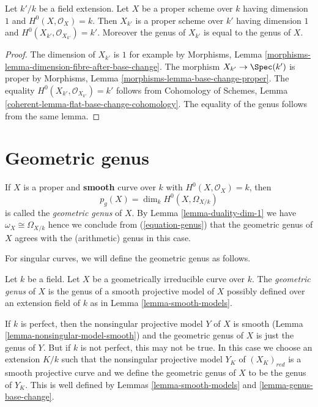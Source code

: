 \begin{lemma}
\label{lemma-genus-base-change}
Let $k'/k$ be a field extension. Let $X$ be a proper scheme over $k$ having
dimension $1$ and $H^0(X, \mathcal{O}_X) = k$. Then $X_{k'}$ is a
proper scheme over $k'$
having dimension $1$ and $H^0(X_{k'}, \mathcal{O}_{X_{k'}}) = k'$.
Moreover the genus of $X_{k'}$ is equal to the genus of $X$.
\end{lemma}

\begin{proof}
The dimension of $X_{k'}$ is $1$ for example by
Morphisms, Lemma \ref{morphisms-lemma-dimension-fibre-after-base-change}.
The morphism $X_{k'} \to \Spec(k')$ is proper by
Morphisms, Lemma \ref{morphisms-lemma-base-change-proper}.
The equality $H^0(X_{k'}, \mathcal{O}_{X_{k'}}) = k'$ follows from
Cohomology of Schemes, Lemma
\ref{coherent-lemma-flat-base-change-cohomology}.
The equality of the genus follows from the same lemma.
\end{proof}



\section{Geometric genus}
\label{section-geometric-genus}

\noindent
If $X$ is a proper and {\bf smooth} curve over $k$ with
$H^0(X, \mathcal{O}_X) = k$, then
$$
p_g(X) = \dim_k H^0(X, \Omega_{X/k})
$$
is called the {\it geometric genus} of $X$. By
Lemma \ref{lemma-duality-dim-1}
we have $\omega_X \cong \Omega_{X/k}$ hence we conclude from
(\ref{equation-genus}) that the geometric genus of $X$ agrees with
the (arithmetic) genus in this case.

\medskip\noindent
For singular curves, we will define the geometric genus as follows.

\begin{definition}
\label{definition-geometric-genus}
Let $k$ be a field. Let $X$ be a geometrically irreducible
curve over $k$. The {\it geometric genus} of $X$ is the genus
of a smooth projective model of $X$ possibly defined over
an extension field of $k$ as in
Lemma \ref{lemma-smooth-models}.
\end{definition}

\noindent
If $k$ is perfect, then the nonsingular projective model $Y$ of $X$
is smooth (Lemma \ref{lemma-nonsingular-model-smooth})
and the geometric genus of $X$ is just the genus of $Y$.
But if $k$ is not perfect, this may not be true.
In this case we choose an extension $K/k$ such that
the nonsingular projective model $Y_K$ of $(X_K)_{red}$ is
a smooth projective curve and we define the geometric genus
of $X$ to be the genus of $Y_K$. This is well defined by
Lemmas \ref{lemma-smooth-models} and \ref{lemma-genus-base-change}.


